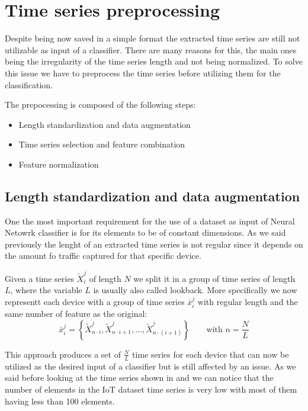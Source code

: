 \section{Time series preprocessing}

Despite being now saved in a simple format the extracted time series are still not utilizable as input of a classifier. There are many reasons for this, the main ones being the irregularity of the time series length and not being normalized. To solve this issue we have to preprocess the time series before utilizing them for the classification. 

The prepocessing is composed of the following steps:
\begin{itemize}
    \item {Length standardization} and data augmentation
    \item Time series selection and feature combination
    \item Feature normalization
\end{itemize}

\subsection{Length standardization and data augmentation}

One the most important requirement for the use of a dataset as input of Neural Netowrk classifier is for its elements to be of constant dimensions. As we said previously the lenght of an extracted time series is not regular since it depends on the amount fo traffic captured for that specific device.

Given a time series ${\tilde{X}_i^j}$ of length $N$ we split it in a group of time series of length $L$, where the variable $L$ is usually also called lookback. More specifically we now representt each device with a group of time series $\bar{x}_i^j$ with regular length and the same number of feature as the original:
\begin{equation}
    \bar{x}_i^j = \left\{\tilde{X}_{n\cdot i}^j, \tilde{X}_{n\cdot i +1 }^j, \dots, \tilde{X}_{n\cdot(i+1)}^j  \right\}
    \qquad\text{with }n=\frac{N}{L}
\end{equation}

This approach produces a set of $\frac{N}{L}$ time series for each device that can now be utilized as the desired input of a classifier but is still affected by an issue. As we said before looking at the time series shown in  and  we can notice that the number of elements in the IoT dataset time series is very low with most of them having less than 100 elements. 

